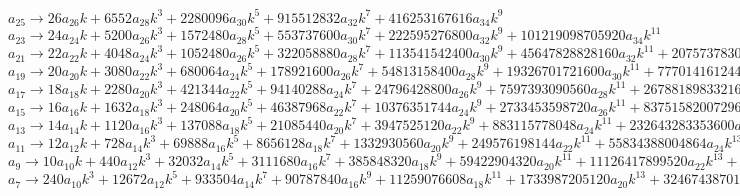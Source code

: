 \documentclass[12pt,a4paper,draft]{article}
\begin{document}
$a_{25}\to 26 a_{26} k+6552 a_{28} k^3+2280096 a_{30} k^5+915512832 a_{32} k^7+416253167616 a_{34} k^9$\\
$a_{23}\to 24 a_{24} k+5200 a_{26} k^3+1572480 a_{28} k^5+553737600 a_{30} k^7+222595276800 a_{32} k^9+101219098705920 a_{34} k^{11}$\\
$a_{21}\to 22 a_{22} k+4048 a_{24} k^3+1052480 a_{26} k^5+322058880 a_{28} k^7+113541542400 a_{30} k^9+45647828828160 a_{32} k^{11}+20757378307522560 a_{34} k^{13}$\\
$a_{19}\to 20 a_{20} k+3080 a_{22} k^3+680064 a_{24} k^5+178921600 a_{26} k^7+54813158400 a_{28} k^9+19326701721600 a_{30} k^{11}+7770141612441600 a_{32} k^{13}+3533311737034506240 a_{34} k^{15}$\\
$a_{17}\to 18 a_{18} k+2280 a_{20} k^3+421344 a_{22} k^5+94140288 a_{24} k^7+24796428800 a_{26} k^9+7597393090560 a_{28} k^{11}+2678818983321600 a_{30} k^{13}+1076998764764528640 a_{32} k^{15}+489743069731226910720 a_{34} k^{17}$\\
$a_{15}\to 16 a_{16} k+1632 a_{18} k^3+248064 a_{20} k^5+46387968 a_{22} k^7+10376351744 a_{24} k^9+2733453598720 a_{26} k^{11}+837515820072960 a_{28} k^{13}+295306112919306240 a_{30} k^{15}+118725592662115614720 a_{32} k^{17}+53988025962427727216640 a_{34} k^{19}$\\
$a_{13}\to 14 a_{14} k+1120 a_{16} k^3+137088 a_{18} k^5+21085440 a_{20} k^7+3947525120 a_{22} k^9+883115778048 a_{24} k^{11}+232643283353600 a_{26} k^{13}+71280785877073920 a_{28} k^{15}+25133441995004313600 a_{30} k^{17}+10104710741630858035200 a_{32} k^{19}+4594909780970778352680960 a_{34} k^{21}$\\
$a_{11}\to 12 a_{12} k+728 a_{14} k^3+69888 a_{16} k^5+8656128 a_{18} k^7+1332930560 a_{20} k^9+249576198144 a_{22} k^{11}+55834388004864 a_{24} k^{13}+14708733593681920 a_{26} k^{15}+4506686150828359680 a_{28} k^{17}+1589047253724207513600 a_{30} k^{19}+638864461525348861870080 a_{32} k^{21}+290510499380104682557931520 a_{34} k^{23}$\\
$a_{9}\to 10 a_{10} k+440 a_{12} k^3+32032 a_{14} k^5+3111680 a_{16} k^7+385848320 a_{18} k^9+59422904320 a_{20} k^{11}+11126417899520 a_{22} k^{13}+2489170300469248 a_{24} k^{15}+655734757395660800 a_{26} k^{17}+200914020585819340800 a_{28} k^{19}+70841825370754410086400 a_{30} k^{21}+28481421507853400250777600 a_{32} k^{23}+12951341769355527641886621696 a_{34} k^{25}$\\
$a_{7}\to 240 a_{10} k^3+12672 a_{12} k^5+933504 a_{14} k^7+90787840 a_{16} k^9+11259076608 a_{18} k^{11}+1733987205120 a_{20} k^{13}+324674387017728 a_{22} k^{15}+72635234665365504 a_{24} k^{17}+19134668627220889600 a_{26} k^{19}+5862771754821054627840 a_{28} k^{21}+2067199948150650018201600 a_{30} k^{23}+831102145627092682901815296 a_{32} k^{25}+377926640014202589716154417152 a_{34} k^{27}+8 a_{8} k$\\
\end{document}
